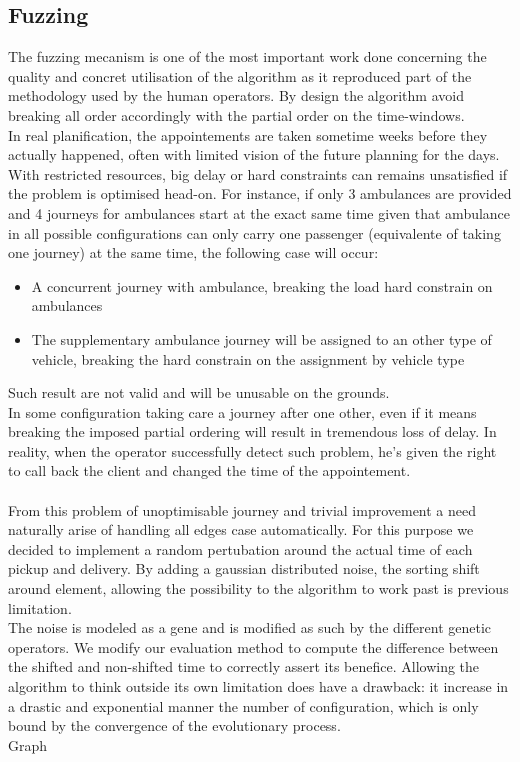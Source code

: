 \documentclass[12pt]{memoir}
\begin{document}
\subsection{Fuzzing}
The fuzzing mecanism is one of the most important work done concerning the quality and concret utilisation
of the algorithm as it reproduced part of the methodology used by the human operators. By design the algorithm 
avoid breaking all order  accordingly with the partial order on the time-windows.\\
In real planification, the 
appointements are taken sometime weeks before they actually happened, often with limited vision of the future 
planning for the days. With restricted resources, big delay or hard constraints can remains unsatisfied if 
the problem is optimised head-on. For instance, if only 3 ambulances are provided and 4 journeys for ambulances 
start at the exact same time given that ambulance in all possible configurations can only carry one passenger
 (equivalente of taking one journey) at the same time, the following case will occur: 
\begin{itemize}
  \item A concurrent journey with ambulance, breaking the load hard constrain on ambulances  
  \item The supplementary ambulance journey will be assigned to an other type of vehicle, 
        breaking the hard constrain on the assignment by vehicle type
\end{itemize}
Such result are not valid and will be unusable on the grounds.\\
In some configuration taking care a journey after one other, even if it means breaking the 
imposed partial ordering will result in tremendous loss of delay. In reality, when the operator 
successfully detect such problem, he's given the right to call back the client and changed the 
time of the appointement. \\ 
\\
From this problem of unoptimisable journey and trivial improvement a need naturally arise of handling 
all edges case automatically. For this purpose we decided to implement a random pertubation around the 
actual time of each pickup and delivery. By adding a gaussian distributed noise, the sorting shift around 
element, allowing the possibility to the algorithm to work past is previous limitation.\\
The noise is modeled as a gene and is modified as such by the different genetic operators. 
We modify our evaluation method to compute the difference between the shifted and non-shifted time 
to correctly assert its benefice. Allowing the algorithm to think outside its own limitation does 
have a drawback: it increase in a drastic and exponential manner the number of configuration, 
which is only bound by the convergence of the evolutionary process.\\
Graph
\end{document}
